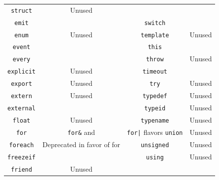\documentclass[openright,twoside,12pt]{report}
\newcommand   {\floatpos}          {htbp}
\begin{document}
\begin{table}[\floatpos]
\begin{tabular}{|c|c||c|c|}
    \lstinline"struct"            & Unused                                  \\
    \lstinline"emit"              &                                         &
    \lstinline"switch"            &                                         \\
    \lstinline"enum"              & Unused                                  &
    \lstinline"template"          & Unused                                  \\
    \lstinline"event"             &                                         &
    \lstinline"this"              &                                         \\
    \lstinline"every"             &                                         &
    \lstinline"throw"             & Unused                                  \\
    \lstinline"explicit"          & Unused                                  &
    \lstinline"timeout"           &                                         \\
    \lstinline"export"            & Unused                                  &
    \lstinline"try"               & Unused                                  \\
    \lstinline"extern"            & Unused                                  &
    \lstinline"typedef"           & Unused                                  \\
    \lstinline"external"          &                                         &
    \lstinline"typeid"            & Unused                                  \\
    \lstinline"float"             & Unused                                  &
    \lstinline"typename"          & Unused                                  \\
    \lstinline"for"               & \lstinline|for&| and                    &
                                    \lstinline-for|- flavors
    \lstinline"union"             & Unused                                  \\
    \lstinline"foreach"           & Deprecated in favor of for              &
    \lstinline"unsigned"          & Unused                                  \\
    \lstinline"freezeif"          &                                         &
    \lstinline"using"             & Unused                                  \\
    \lstinline"friend"            & Unused                                  &

\end{tabular}
\end{table}
\end{document}
